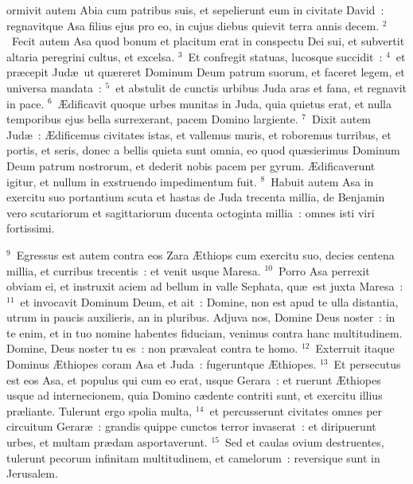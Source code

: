 \bchapter
{}ormivit autem Abia cum patribus suis, et sepelierunt eum in civitate David~: regnavitque Asa filius ejus pro eo, in cujus diebus quievit terra annis decem.
${}^{2}$~Fecit autem Asa quod bonum et placitum erat in conspectu Dei sui, et subvertit altaria peregrini cultus, et excelsa.
${}^{3}$~Et confregit statuas, lucosque succidit~:
${}^{4}$~et pr\ae cepit Jud\ae\ ut qu\ae reret Dominum Deum patrum suorum, et faceret legem, et universa mandata~:
${}^{5}$~et abstulit de cunctis urbibus Juda aras et fana, et regnavit in pace.
${}^{6}$~\AE dificavit quoque urbes munitas in Juda, quia quietus erat, et nulla temporibus ejus bella surrexerant, pacem Domino largiente.
${}^{7}$~Dixit autem Jud\ae~: \AE dificemus civitates istas, et vallemus muris, et roboremus turribus, et portis, et seris, donec a bellis quieta sunt omnia, eo quod qu\ae sierimus Dominum Deum patrum nostrorum, et dederit nobis pacem per gyrum. \AE dificaverunt igitur, et nullum in exstruendo impedimentum fuit.
${}^{8}$~Habuit autem Asa in exercitu suo portantium scuta et hastas de Juda trecenta millia, de Benjamin vero scutariorum et sagittariorum ducenta octoginta millia~: omnes isti viri fortissimi.


${}^{9}$~Egressus est autem contra eos Zara \AE thiops cum exercitu suo, decies centena millia, et curribus trecentis~: et venit usque Maresa.
${}^{10}$~Porro Asa perrexit obviam ei, et instruxit aciem ad bellum in valle Sephata, qu\ae\ est juxta Maresa~:
${}^{11}$~et invocavit Dominum Deum, et ait~: Domine, non est apud te ulla distantia, utrum in paucis auxilieris, an in pluribus. Adjuva nos, Domine Deus noster~: in te enim, et in tuo nomine habentes fiduciam, venimus contra hanc multitudinem. Domine, Deus noster tu es~: non pr\ae valeat contra te homo.
${}^{12}$~Exterruit itaque Dominus \AE thiopes coram Asa et Juda~: fugeruntque \AE thiopes.
${}^{13}$~Et persecutus est eos Asa, et populus qui cum eo erat, usque Gerara~: et ruerunt \AE thiopes usque ad internecionem, quia Domino c\ae dente contriti sunt, et exercitu illius pr\ae liante. Tulerunt ergo spolia multa,
${}^{14}$~et percusserunt civitates omnes per circuitum Gerar\ae~: grandis quippe cunctos terror invaserat~: et diripuerunt urbes, et multam pr\ae dam asportaverunt.
${}^{15}$~Sed et caulas ovium destruentes, tulerunt pecorum infinitam multitudinem, et camelorum~: reversique sunt in Jerusalem.

